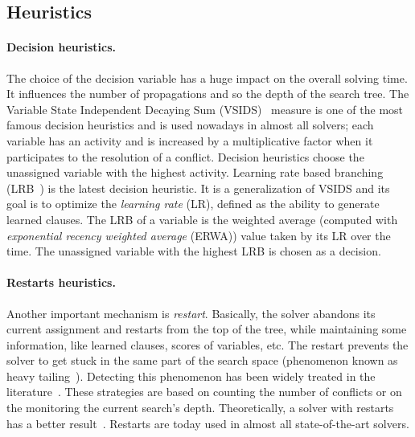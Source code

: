  
 
\subsection{Heuristics}\label{sec:heuristics}

\paragraph{Decision heuristics.}
 The choice of the 
 decision variable has a huge impact on the 
overall solving time. It influences the number of propagations and so 
the depth of the search tree.
 The Variable State Independent Decaying Sum (VSIDS)~\cite{moskewicz2001chaff} measure is one of the most famous decision heuristics and is used
nowadays in almost all solvers; each variable has an activity and  is increased by a multiplicative factor 
when it participates to the resolution of a conflict.
Decision heuristics choose the unassigned variable with the highest activity.
Learning rate based branching (LRB~\cite{liang2016learning}) is the latest decision heuristic. It is a
generalization of VSIDS and its goal is to optimize the \emph{learning rate} (LR), defined as the ability to generate
learned clauses. The LRB of a variable is the weighted average (computed with \emph{exponential recency
weighted average} (ERWA))  value taken by its LR over the time. The unassigned variable with the highest LRB is chosen as a decision. 

\paragraph{Restarts heuristics.}
Another important mechanism is \emph{restart}. Basically, the solver abandons its current assignment and 
restarts from the top of the tree, while maintaining some information, like learned clauses, scores of variables, etc.
 The restart prevents the solver to get stuck in the same part of the search space (phenomenon known as heavy tailing~\cite{gomes1997heavy}).
Detecting this phenomenon has been widely treated in the literature~\cite{audemard2012refining,biere2008adaptive}.
These strategies are based on counting the number of conflicts or on the monitoring the current search’s depth.
Theoretically, a solver with restarts has a better result~\cite{huang2007effect}. Restarts are today
used in almost all state-of-the-art solvers.

